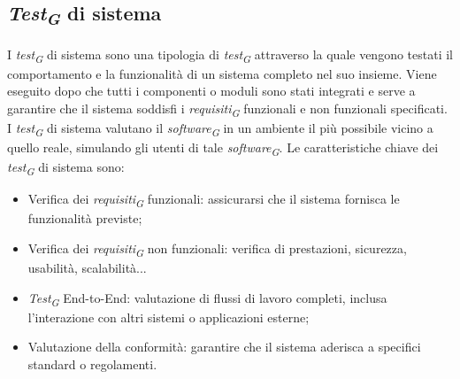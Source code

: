 \subsection{\textit{Test\textsubscript{G}} di sistema}
I \textit{test\textsubscript{G}} di sistema sono una tipologia di \textit{test\textsubscript{G}} attraverso la quale vengono testati il comportamento e la funzionalità di un sistema completo nel suo insieme. Viene eseguito dopo che tutti i componenti o moduli sono stati integrati e serve a garantire che il sistema soddisfi i \textit{requisiti\textsubscript{G}} funzionali e non funzionali specificati. I \textit{test\textsubscript{G}} di sistema valutano il \textit{software\textsubscript{G}} in un ambiente il più possibile vicino a quello reale, simulando gli utenti di tale \textit{software\textsubscript{G}}. Le caratteristiche chiave dei \textit{test\textsubscript{G}} di sistema sono:
\begin{itemize}
    \item Verifica dei \textit{requisiti\textsubscript{G}} funzionali: assicurarsi che il sistema fornisca le funzionalità previste;
    \item Verifica dei \textit{requisiti\textsubscript{G}} non funzionali: verifica di prestazioni, sicurezza, usabilità, scalabilità...
    \item \textit{Test\textsubscript{G}} End-to-End: valutazione di flussi di lavoro completi, inclusa l'interazione con altri sistemi o applicazioni esterne;
    \item Valutazione della conformità: garantire che il sistema aderisca a specifici standard o regolamenti.
\end{itemize}
